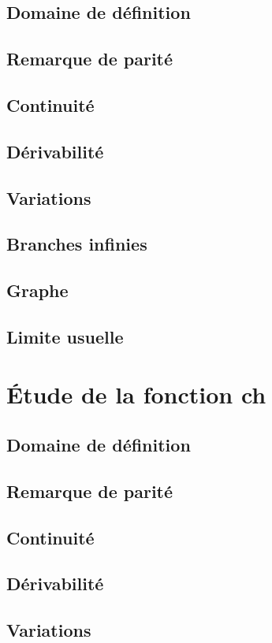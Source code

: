 \documentclass[12pt,a4paper,french]{book}
\begin{document}
		\subsection{Domaine de définition}
		\subsection{Remarque de parité}
		\subsection{Continuité}
		\subsection{Dérivabilité}
		\subsection{Variations}
		\subsection{Branches infinies}
		\subsection{Graphe}
		\subsection{Limite usuelle}
	\section{Étude de la fonction ch}
		\subsection{Domaine de définition}
		\subsection{Remarque de parité}
		\subsection{Continuité}
		\subsection{Dérivabilité}
		\subsection{Variations}
\end{document}

